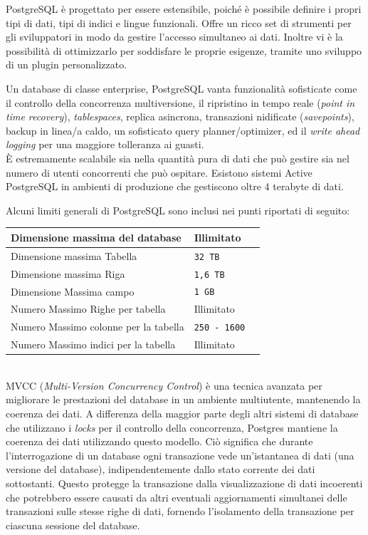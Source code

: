 PostgreSQL \`{e} progettato per essere estensibile, poich\'{e} \`{e} possibile definire i propri tipi di dati, tipi di indici e lingue funzionali. Offre un ricco set di strumenti per gli sviluppatori in modo da gestire l'accesso simultaneo ai dati. Inoltre vi \`{e} la possibilit\`{a} di ottimizzarlo per soddisfare le proprie esigenze, tramite uno sviluppo di un plugin personalizzato.

Un database di classe enterprise, PostgreSQL vanta funzionalit\`{a} sofisticate come il controllo della concorrenza multiversione, il ripristino in tempo reale (\textit{point in time recovery}), \textit{tablespaces}, replica asincrona, transazioni nidificate (\textit{savepoints}), backup in linea/a caldo, un sofisticato query planner/optimizer, ed il \textit{write ahead logging} per una maggiore tolleranza ai guasti.\\
\`{E} estremamente scalabile sia nella quantit\`{a} pura di dati che pu\`{o} gestire sia nel numero di utenti concorrenti che pu\`{o} ospitare. Esistono sistemi Active PostgreSQL in	 ambienti di produzione che gestiscono oltre 4 terabyte di dati.\cite{etichetta15}

Alcuni limiti generali di PostgreSQL sono inclusi nei punti riportati di seguito:\\

\begin{tabular}{|l|l|r|}
\hline
Dimensione massima del database & Illimitato\\
\hline
Dimensione massima Tabella & \verb"32 TB"\\
\hline
Dimensione massima Riga & \verb"1,6 TB"\\
\hline
Dimensione Massima campo & \verb"1 GB"\\
\hline
Numero Massimo Righe per tabella & Illimitato\\
\hline
Numero Massimo colonne per la tabella & \verb"250 - 1600"\\
\hline
Numero Massimo indici per la tabella & Illimitato\cite{etichetta12}\\
\hline
\end{tabular}\\


MVCC (\textit{Multi-Version Concurrency Control}) \`{e} una tecnica avanzata per migliorare le prestazioni del database in un ambiente multiutente, mantenendo la coerenza dei dati. 
A differenza della maggior parte degli altri sistemi di database che utilizzano i \textit{locks} per il controllo della concorrenza, Postgres mantiene la coerenza dei dati utilizzando questo modello. Ci\`{o} significa che durante l'interrogazione di un database ogni transazione vede un'istantanea di dati (una versione del database), indipendentemente dallo stato corrente dei dati sottostanti. Questo protegge la transazione dalla visualizzazione di dati incoerenti che potrebbero essere causati da altri eventuali aggiornamenti simultanei delle transazioni sulle stesse righe di dati, fornendo l'isolamento della transazione per ciascuna sessione del database.

